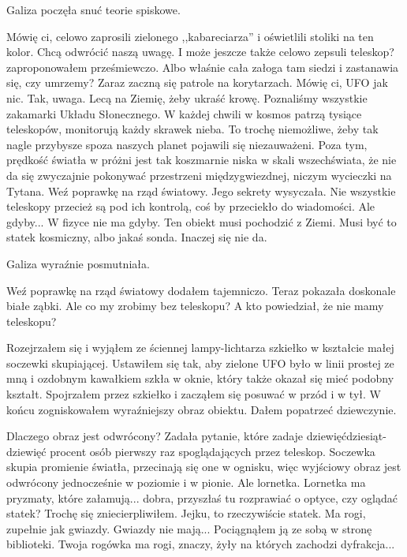 Galiza poczęła snuć teorie spiskowe.
\begin{dialogue}
	\ds{} Mówię ci, celowo zaprosili zielonego ,,kabareciarza'' i oświetlili stoliki na ten kolor. Chcą odwrócić naszą uwagę.
	\ds{} I może jeszcze także celowo zepsuli teleskop? \dm{} zaproponowałem prześmiewczo.
	\ds{} Albo właśnie cała załoga tam siedzi i zastanawia się, czy umrzemy? Zaraz zaczną się patrole na korytarzach. Mówię ci, UFO jak nic.
	\ds{} Tak, uwaga. Lecą na Ziemię, żeby ukraść krowę. Poznaliśmy wszystkie zakamarki Układu Słonecznego. W każdej chwili w kosmos patrzą tysiące teleskopów, monitorują każdy skrawek nieba. To trochę niemożliwe, żeby tak nagle przybysze spoza naszych planet pojawili się niezauważeni. Poza tym, prędkość światła w próżni jest tak koszmarnie niska w skali wszechświata, że nie da się zwyczajnie pokonywać przestrzeni międzygwiezdnej, niczym wycieczki na Tytana.
	\ds{} Weź poprawkę na rząd światowy. Jego sekrety \dm{} wysyczała.
	\ds{} Nie wszystkie teleskopy przecież są pod ich kontrolą, coś by przeciekło do wiadomości.
	\ds{} Ale gdyby...
	\ds{} W fizyce nie ma gdyby. Ten obiekt musi pochodzić z Ziemi. Musi być to statek kosmiczny, albo jakaś sonda. Inaczej się nie da.
\end{dialogue}

Galiza wyraźnie posmutniała.

\begin{dialogue}
	\ds{} Weź poprawkę na rząd światowy \dm{} dodałem tajemniczo. Teraz pokazała doskonale białe ząbki.
	\ds{} Ale co my zrobimy bez teleskopu?
	\ds{} A kto powiedział, że nie mamy teleskopu?
\end{dialogue}

Rozejrzałem się i wyjąłem ze ściennej lampy-lichtarza szkiełko w kształcie małej soczewki skupiającej.
Ustawiłem się tak, aby zielone UFO było w linii prostej ze mną i ozdobnym kawałkiem szkła w oknie, który także okazał się mieć podobny kształt.
Spojrzałem przez szkiełko i zacząłem się posuwać w przód i w tył. W końcu zogniskowałem wyraźniejszy obraz obiektu.
Dałem popatrzeć dziewczynie.

\begin{dialogue}
	\ds{} Dlaczego obraz jest odwrócony? \dm{} Zadała pytanie, które zadaje dziewięćdziesiąt-dziewięć procent osób pierwszy raz spoglądających przez teleskop.
	\ds{} Soczewka skupia promienie światła, przecinają się one w ognisku, więc wyjściowy obraz jest odwrócony jednocześnie w poziomie i w pionie.
	\ds{} Ale lornetka.
	\ds{} Lornetka ma pryzmaty, które załamują... dobra, przyszłaś tu rozprawiać o optyce, czy oglądać statek? \dm{} Trochę się zniecierpliwiłem.
	\ds{} Jejku, to rzeczywiście statek. Ma rogi, zupełnie jak gwiazdy.
	\ds{} Gwiazdy nie mają... \dm{} Pociągnąłem ją ze sobą w stronę biblioteki. \dm{} Twoja rogówka ma rogi, znaczy, żyły na których zachodzi dyfrakcja...
\end{dialogue}

